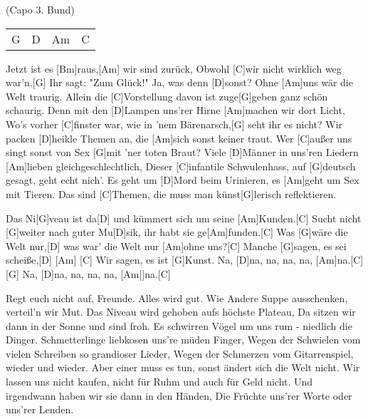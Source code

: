 
{\footnotesize(Capo 3. Bund)}

\begin{guitar}
	{\footnotesize\begin{tabular}{l|l|l|l}
		G	& D	& Am	& C
	\end{tabular}}
	
	Jetzt ist es [Bm]raus,[Am] wir sind zurück,
	Obwohl [C]wir nicht wirklich weg war'n.[G] Ihr sagt: "Zum Glück!"
	Ja, was denn [D]sonst? Ohne [Am]uns wär die Welt traurig.
	Allein die [C]Vorstellung davon ist zuge[G]geben ganz schön schaurig.
	Denn mit den [D]Lampen uns'rer Hirne [Am]machen wir dort Licht,
	Wo's vorher [C]finster war, wie in 'nem Bärenarsch,[G] seht ihr es nicht?
	Wir packen [D]heikle Themen an, die [Am]sich sonst keiner traut.
	Wer [C]außer uns singt sonst von Sex [G]mit 'ner toten Braut?
	Viele [D]Männer in uns'ren Liedern [Am]lieben gleichgeschlechtlich,
	Dieser [C]infantile Schwulenhass, auf [G]deutsch gesagt, geht echt nich'.
	Es geht um [D]Mord beim Urinieren, es [Am]geht um Sex mit Tieren.
	Das sind [C]Themen, die muss man künst[G]lerisch reflektieren.
	
	Das Ni[G]veau ist da[D] und kümmert sich um seine [Am]Kunden.[C]{}
	Sucht nicht [G]weiter nach guter Mu[D]sik, ihr habt sie ge[Am]funden.[C]{}
	Was [G]wäre die Welt nur,[D] was war' die Welt nur [Am]ohne uns?[C]{}
	Manche [G]sagen, es sei scheiße,[D] [Am] [C]{}
	Wir sagen, es ist [G]Kunst. Na, [D]na, na, na, na, [Am]na.[C]{}
	[G] Na, [D]na, na, na, na, [Am|]{na.}[C]{}
	
	\pagebreak
	
	Regt euch nicht auf, Freunde. Alles wird gut.
	Wie Andere Suppe ausschenken, verteil'n wir Mut.
	Das Niveau wird gehoben aufs höchste Plateau,
	Da sitzen wir dann in der Sonne und sind froh.
	Es schwirren Vögel um uns rum - niedlich die Dinger.
	Schmetterlinge liebkosen uns're müden Finger,
	Wegen der Schwielen vom vielen Schreiben so grandioser Lieder,
	Wegen der Schmerzen vom Gitarrenspiel, wieder und wieder.
	Aber einer muss es tun, sonst ändert sich die Welt nicht.
	Wir lassen uns nicht kaufen, nicht für Ruhm und auch für Geld nicht.
	Und irgendwann haben wir sie dann in den Händen,
	Die Früchte uns'rer Worte oder uns'rer Lenden.
	
	 
\end{guitar}